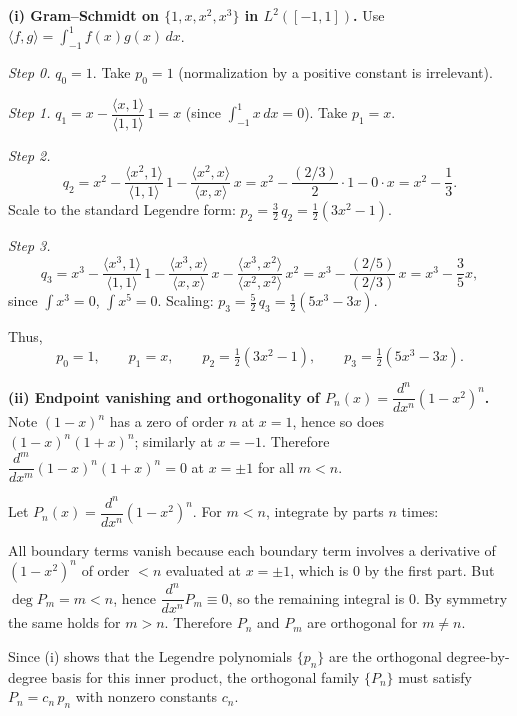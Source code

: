 \begin{solution}
\par\smallskip\noindent\textbf{(i) Gram--Schmidt on $\{1,x,x^2,x^3\}$ in $L^2([-1,1])$.}\quad
Use $\langle f,g\rangle=\int_{-1}^1 f(x)g(x)\,dx$.

\emph{Step 0.} $q_0=1$. Take $p_0=1$ (normalization by a positive constant is irrelevant).

\emph{Step 1.} $q_1=x-\dfrac{\langle x,1\rangle}{\langle 1,1\rangle}\,1=x$ (since $\int_{-1}^1 x\,dx=0$). Take $p_1=x$.

\emph{Step 2.}
\[
q_2=x^2-\frac{\langle x^2,1\rangle}{\langle 1,1\rangle}\,1
-\frac{\langle x^2,x\rangle}{\langle x,x\rangle}\,x
= x^2-\frac{(2/3)}{2}\cdot 1-0\cdot x
= x^2-\frac{1}{3}.
\]
Scale to the standard Legendre form: $p_2=\frac{3}{2}\,q_2=\frac{1}{2}(3x^2-1)$.

\emph{Step 3.}
\[
q_3=x^3-\frac{\langle x^3,1\rangle}{\langle 1,1\rangle}\,1
-\frac{\langle x^3,x\rangle}{\langle x,x\rangle}\,x
-\frac{\langle x^3,x^2\rangle}{\langle x^2,x^2\rangle}\,x^2
= x^3-\frac{(2/5)}{(2/3)}\,x
= x^3-\frac{3}{5}x,
\]
since $\int x^3=0$, $\int x^5=0$. Scaling: $p_3=\frac{5}{2}\,q_3=\frac{1}{2}(5x^3-3x)$.

Thus,
\[
p_0=1,\qquad p_1=x,\qquad p_2=\tfrac{1}{2}(3x^2-1),\qquad p_3=\tfrac{1}{2}(5x^3-3x).
\]

\par\smallskip\noindent\textbf{(ii) Endpoint vanishing and orthogonality of $P_n(x)=\dfrac{d^n}{dx^n}(1-x^2)^n$.}\quad
Note $(1-x)^n$ has a zero of order $n$ at $x=1$, hence so does $(1-x)^n(1+x)^n$; similarly at $x=-1$.
Therefore $\dfrac{d^m}{dx^m}(1-x)^n(1+x)^n=0$ at $x=\pm1$ for all $m<n$.

Let $P_n(x)=\dfrac{d^n}{dx^n}(1-x^2)^n$. For $m<n$,
integrate by parts $n$ times:
\begin{center}
\end{center}
All boundary terms vanish because each boundary term involves a derivative of $(1-x^2)^n$ of order $<n$ evaluated at $x=\pm1$, which is $0$ by the first part.
But $\deg P_m=m<n$, hence $\dfrac{d^n}{dx^n}P_m\equiv0$, so the remaining integral is $0$.
By symmetry the same holds for $m>n$. Therefore $P_n$ and $P_m$ are orthogonal for $m\ne n$.

Since (i) shows that the Legendre polynomials $\{p_n\}$ are the orthogonal degree-by-degree basis for this inner product, the orthogonal family $\{P_n\}$ must satisfy $P_n=c_n\,p_n$ with nonzero constants $c_n$.


\end{solution}
